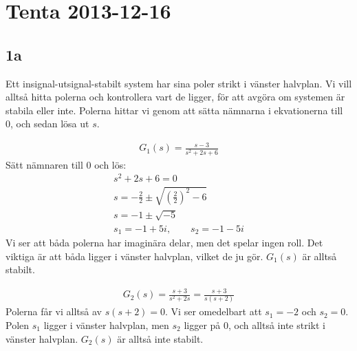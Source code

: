 \documentclass[a4paper]{article}
\begin{document}
\section{Tenta 2013-12-16}
\subsection{1a}
Ett insignal-utsignal-stabilt system har sina poler strikt i vänster halvplan. Vi vill alltså hitta polerna och kontrollera vart de ligger, för att avgöra om systemen är stabila eller inte. Polerna hittar vi genom att sätta nämnarna i ekvationerna till 0, och sedan lösa ut $s$.

\begin{align*}
  G_1(s) = \frac{s-3}{s^2+2s+6}
\end{align*}
%
Sätt nämnaren till 0 och lös:
\begin{align*}
  s^2+2s+6 = 0\\
  s = -\frac{2}{2} \pm \sqrt{\left(\frac{2}{2}\right)^2 -6}\\
  s = -1 \pm \sqrt{-5}\\
  s_1 = -1 + 5i, \qquad s_2 = -1 - 5i
\end{align*}
%
Vi ser att båda polerna har imaginära delar, men det spelar ingen roll. Det viktiga är att båda ligger i vänster halvplan, vilket de ju gör. $G_1(s)$ är alltså stabilt.

\begin{align*}
  G_2(s) = \frac{s+3}{s^2+2s} = \frac{s+3}{s(s+2)}
\end{align*}
%
Polerna får vi alltså av $s(s+2) = 0$. Vi ser omedelbart att $s_1 = -2$ och $s_2 = 0$. Polen $s_1$ ligger i vänster halvplan, men $s_2$ ligger på 0, och alltså inte strikt i vänster halvplan. $G_2(s)$ är alltså inte stabilt.
\end{document}
